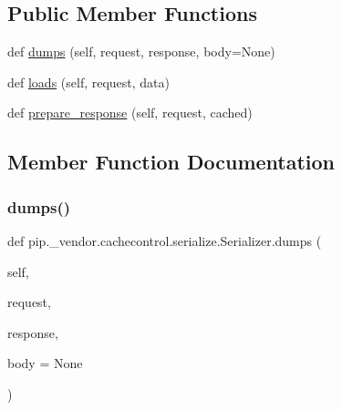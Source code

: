 \subsection*{Public Member Functions}
\begin{DoxyCompactItemize}
\item 
def \hyperlink{classpip_1_1__vendor_1_1cachecontrol_1_1serialize_1_1Serializer_a2da169cfdef1ae5e059a4f1ee53e6359}{dumps} (self, request, response, body=None)
\item 
def \hyperlink{classpip_1_1__vendor_1_1cachecontrol_1_1serialize_1_1Serializer_a61a7b81edc4e8dd2863e1421a67fb7ab}{loads} (self, request, data)
\item 
def \hyperlink{classpip_1_1__vendor_1_1cachecontrol_1_1serialize_1_1Serializer_aa458f1b3dc76a826ab1fd071f4255d74}{prepare\+\_\+response} (self, request, cached)
\end{DoxyCompactItemize}


\subsection{Member Function Documentation}
\mbox{\label{classpip_1_1__vendor_1_1cachecontrol_1_1serialize_1_1Serializer_a2da169cfdef1ae5e059a4f1ee53e6359}} 
\subsubsection{\texorpdfstring{dumps()}{dumps()}}
{\footnotesize\ttfamily def pip.\+\_\+vendor.\+cachecontrol.\+serialize.\+Serializer.\+dumps (\begin{DoxyParamCaption}\item[{}]{self,  }\item[{}]{request,  }\item[{}]{response,  }\item[{}]{body = {\ttfamily None} }\end{DoxyParamCaption})}

\mbox{\label{classpip_1_1__vendor_1_1cachecontrol_1_1serialize_1_1Serializer_a61a7b81edc4e8dd2863e1421a67fb7ab}} 
